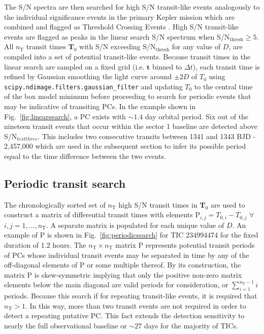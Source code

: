 The S/N spectra are then searched for high S/N transit-like events analogously to the individual
significance events in the primary Kepler mission which are combined and flagged as Threshold Crossing
Events \citep{jenkins10}.
High S/N transit-like events are flagged as peaks in the linear search S/N spectrum when
S/N$_{\text{thresh}}\geq 5$.
All $n_{\text{T}}$ transit times $\mathbf{T}_0$ with S/N exceeding S/N$_{\text{thresh}}$ for
any value of $D$, are compiled into a set of potential transit-like events.
Because transit times in the linear search are sampled on a fixed grid (i.e.
$\mathbf{t}$ binned to $\Delta t$), each transit time is refined by Gaussian smoothing the light curve
around $\pm 2D$ of $T_0$ using \texttt{scipy.ndimage.filters.gaussian\_filter} and updating $T_0$ to the
central time of the box model minimum before proceeding to search for periodic events that may
be indicative of transiting PCs. In the example shown in Fig.~\ref{fig:linearsearch},
a PC exists with $\sim 1.4$ day orbital period. Six out of the nineteen transit events
that occur within the sector 1 baseline are detected above S/N$_{text{thres}}$. This includes two
consecutive transits between 1341 and 1343 BJD - 2,457,000 which are used in the subsequent
section to infer its possible period equal to the time difference between the two events. 

\subsection{Periodic transit search} \label{sect:periodic}
The chronologically sorted set of $n_{\text{T}}$ high S/N transit times in $\mathbf{T}_0$
are used to construct a matrix of differential transit times with
elements P$_{i,j} = T_{0,i} - T_{0,j}$ $\forall$ $i,j=1,\dots,n_{\text{T}}$.
A separate matrix is populated for each unique value of $D$. An example of
P is shown in Fig.~\ref{fig:periodicsearch} for TIC 234994474 for the fixed duration of 1.2 hours. 
The $n_{\text{T}} \times n_{\text{T}}$ matrix P represents potential transit periods of
PCs whose individual transit events
may be separated in time by any of the off-diagonal elements of P or some multiple thereof.
By its construction, the matrix P is skew-symmetric implying that only the positive non-zero matrix elements
below the main diagonal are valid periods for consideration, or $\sum_{i=1}^{n_{\text{T}}-1}i$ periods.
Because this search if for repeating transit-like events, it is required that $n_{\text{T}}>1$. In this
way, more than two transit events are not required in order to detect a repeating putative 
PC. This fact extends the \pipeline{} detection sensitivity to nearly the full observational baseline
or $\sim 27$ days for the majority of TICs.

